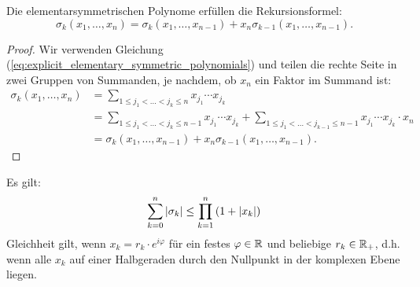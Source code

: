 \begin{lemma}
    \label{lemma:recursion_elementary_symmetric_polynomials}
    Die elementarsymmetrischen Polynome erfüllen die Rekursionsformel:
    \begin{equation}
        \label{eq:recursion_elementary_symmetric_polynomials}
        \sigma_k (x_1, \dots, x_{n}) = \sigma_k (x_1, \dots, x_{n-1}) + x_{n} \sigma_{k-1} (x_1, \dots, x_{n-1}).
    \end{equation}
\end{lemma}

\begin{proof}
    Wir verwenden Gleichung (\ref{eq:explicit_elementary_symmetric_polynomials})
    und teilen die rechte Seite in zwei Gruppen von Summanden, je nachdem, ob
    $x_n$ ein Faktor im Summand ist:
    \begin{equation*}
        \begin{split}
            \sigma_k (x_1, \dots, x_{n})
            &= \sum_{1 \leq j_1 < \dots < j_k \leq n} x_{j_1} \cdots x_{j_k}\\
            &= \sum_{1 \leq j_1 < \dots < j_k \leq n-1} x_{j_1} \cdots x_{j_k}
            + \sum_{1 \leq j_1 < \dots < j_{k-1} \leq n-1} x_{j_1} \cdots x_{j_k} \cdot x_{n}\\
            &= \sigma_k (x_1, \dots, x_{n-1}) + x_{n} \sigma_{k-1} (x_1, \dots, x_{n-1}).
        \end{split}
    \end{equation*}
\end{proof}

\begin{lemma}
    \label{lemma:elementary_symmetric_polynomials_inequality}
    Es gilt:
    \begin{equation}
        \label{eq:elementary_symmetric_polynomials_inequality}
        \sum_{k=0}^{n} \left\lvert \sigma_{k} \right\rvert \leq \prod_{k=1}^{n} \left( 1 + \left\lvert x_k \right\rvert \right)
    \end{equation}
    Gleichheit gilt, wenn $x_k = r_k \cdot e^{i\varphi}$ für ein
    festes $\varphi \in \mathbb{R}$ und beliebige $r_k \in \mathbb{R}_+$,
    d.h. wenn alle $x_k$ auf einer Halbgeraden durch den Nullpunkt
    in der komplexen Ebene liegen.
\end{lemma}

